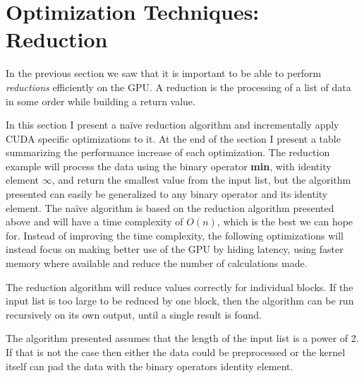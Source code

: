 


\section{Optimization Techniques: Reduction}\label{sec:reduce}


In the previous section we saw that it is important to be able to perform
\textit{reductions} efficiently on the GPU. A reduction is the processing of a
list of data in some order while building a return value.


In this section I present a naïve reduction algorithm and incrementally apply
CUDA specific optimizations to it. At the end of the section I present a table
summarizing the performance increase of each optimization. The reduction example
will process the data using the binary operator \textbf{min}, with identity
element $\infty$, and return the smallest value from the input list, but the
algorithm presented can easily be generalized to any binary operator and its
identity element. The naïve algorithm is based on the reduction algorithm
presented above and will have a time complexity of $O(n)$, which is the best we
can hope for. Instead of improving the time complexity, the following
optimizations will instead focus on making better use of the GPU by hiding
latency, using faster memory where available and reduce the number of
calculations made.


The reduction algorithm will reduce values correctly for individual blocks. If
the input list is too large to be reduced by one block, then the algorithm can
be run recursively on its own output, until a single result is found.

The algorithm presented assumes that the length of the input list is a
power of 2. If that is not the case then either the data could be
preprocessed or the kernel itself can pad the data with the binary
operators identity element.

